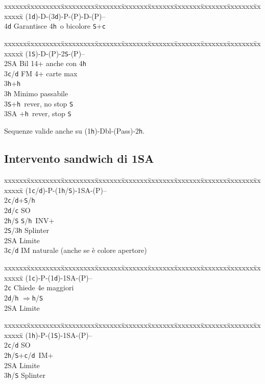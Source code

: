 \documentclass[a4paper,italian]{article}
\newcommand{\BS}{\small{\texttt{S}}}
\newcommand{\BC}{\small{\texttt{c}}}
\newcommand{\BD}{\small{\texttt{d}}}
\newcommand{\BH}{\small{\texttt{h}}}
\newenvironment{bidtable}
{\begin{tabbing}

    xxxxxx\=xxxxxxxxx\=xxxxxxxxx\=xxxxxxx\=xxxxxxx\=xxxxxxx\=xxxxxxx\=xxxxxxx\=xxxxxxx\=xxxxxxx\=\kill}
{\end{tabbing} }%
\begin{document}
\begin{multicols}{2}
    \begin{bidtable}
        (1\BD)-D-(3\BD)-P-(P)-D-(P)--\+\\
        4\BD \> Garantisce 4\BH\ o bicolore \BS +\BC \-
    \end{bidtable}

    \begin{bidtable}
        (1\BS)-D-(P)-2\BS-(P)--\+\\
        2\small{SA} \> Bil 14+ anche con 4\BH \\
        3\BC/\BD \> FM 4+ carte max\+\\
        3\BH {}+\BH \-\\
        3\BH \> Minimo passabile\\
        3\BS {}+\BH\ rever, no stop \BS\\
        3\small{SA} +\BH\ rever, stop \BS\-
    \end{bidtable}

    Sequenze valide anche su (1\BH )-Dbl-(Pass)-2\BH.

    \subsection{Intervento sandwich di 1SA}

    \begin{bidtable}
        (1\BC/\BD)-P-(1\BH/\BS)-1\small{SA}-(P)--\+\\
        2\BC/\BD{}+\BS/\BH\\
        2\BD/\BC\> SO\\
        2\BH/\BS{} \BS/\BH\ INV+\\
        2\BS/3\BH\> Splinter\\
        2\small{SA}\> Limite\\
        3\BC/\BD\> IM naturale (anche se è colore apertore)
    \end{bidtable}
    \begin{bidtable}
        (1\BC)-P-(1\BD)-1\small{SA}-(P)--\+\\
        2\BC\> Chiede 4e maggiori\\
        2\BD/\BH\> $\Rightarrow$\BH/\BS\\
        2\small{SA}\> Limite\-
    \end{bidtable}
    \begin{bidtable}
        (1\BH)-P-(1\BS)-1\small{SA}-(P)--\+\\
        2\BC/\BD\> SO\\
        2\BH/\BS{}+\BC/\BD\ IM+\\
        2\small{SA}\> Limite\\
        3\BH/\BS\> Splinter
    \end{bidtable}
    \vfill\null
    \columnbreak


\end{multicols}
\end{document}
